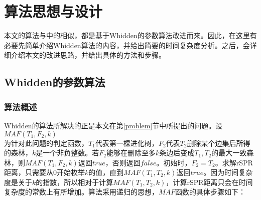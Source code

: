 
\chapter{算法思想与设计}
本文的算法与\cite{chen2012faster}中的相似，都是基于Whidden的参数算法改进而来。因此，在这里有必要先简单介绍Whidden算法的内容，并给出简要的时间复杂度分析。之后，会详细介绍本文的改进思路，并给出具体的方法和步骤。

\section{Whidden的参数算法}
\subsection{算法概述} \label{whidden_algo}

Whidden的算法所解决的正是本文在第\ref{problem}节中所提出的问题。设$MAF(T_1,F_2,k)$\\为针对此问题的判定函数，$T_1$代表第一棵进化树，$F_2$代表$T_2$删除某个边集后所得的森林，$k$是一个非负整数。若$F_2$能够在删除至多$k$条边后变成$T_1,T_2$的最大一致森林，则$MAF(T_1,F_2,k)$返回$true$，否则返回$false$。初始时，$F_2 = T_2$。求解rSPR距离，只需要从$0$开始枚举$k$的值，直到$MAF(T_1,T_2,k)$返回$true$。因为时间复杂度是关于$k$的指数，所以相对于计算$MAF(T_1,T_2,k)$，计算rSPR距离只会在时间复杂度的常数上有所增加。算法采用递归的思想，$MAF$函数的具体步骤如下：

